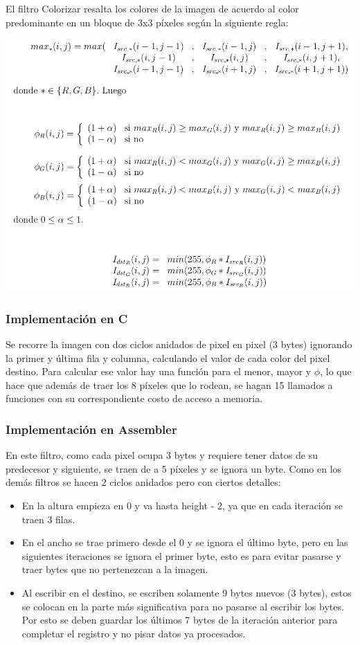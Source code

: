 El filtro Colorizar resalta los colores de la imagen de acuerdo al color predominante en un bloque de 3x3 píxeles según la siguiente regla:

\includegraphics[width=\textwidth]{colorizar.jpg} 

\subsubsection{Implementación en C}

Se recorre la imagen con dos ciclos anidados de pixel en pixel (3 bytes) ignorando la primer y última fila y columna, calculando el valor de cada color del pixel destino.
Para calcular ese valor hay una función para el menor, mayor y $\phi$, lo que hace que además de traer los 8 píxeles que lo rodean, se hagan 15 llamados a funciones con su correspondiente costo de acceso a memoria.

\subsubsection{Implementación en Assembler}

En este filtro, como cada pixel ocupa 3 bytes y requiere tener datos de su predecesor y siguiente, se traen de a 5 píxeles y se ignora un byte.
Como en los demás filtros se hacen 2 ciclos anidados pero con ciertos detalles:
\begin{itemize}
\item En la altura empieza en 0 y va hasta height - 2, ya que en cada iteración se traen 3 filas.
\item En el ancho se trae primero desde el 0 y se ignora el último byte, pero en las siguientes iteraciones se ignora el primer byte, esto es para evitar pasarse y traer bytes que no pertenezcan a la imagen.
\item Al escribir en el destino, se escriben solamente 9 bytes nuevos (3 bytes), estos se colocan en la parte más significativa para no pasarse al escribir los bytes. Por esto se deben guardar los últimos 7 bytes de la iteración anterior para completar el registro y no pisar datos ya procesados.
\end{itemize}

